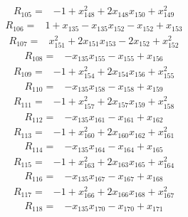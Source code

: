 \begin{align*}
R_{105}={}&-1+x_{148}^{2}+2x_{148}x_{150}+x_{149}^{2}
\end{align*}
\begin{align*}
R_{106}={}&1+x_{135}-x_{135}x_{152}-x_{152}+x_{153}
\end{align*}
\begin{align*}
R_{107}={}&x_{151}^{2}+2x_{151}x_{153}-2x_{152}+x_{152}^{2}
\end{align*}
\begin{align*}
R_{108}={}&-x_{135}x_{155}-x_{155}+x_{156}
\end{align*}
\begin{align*}
R_{109}={}&-1+x_{154}^{2}+2x_{154}x_{156}+x_{155}^{2}
\end{align*}
\begin{align*}
R_{110}={}&-x_{135}x_{158}-x_{158}+x_{159}
\end{align*}
\begin{align*}
R_{111}={}&-1+x_{157}^{2}+2x_{157}x_{159}+x_{158}^{2}
\end{align*}
\begin{align*}
R_{112}={}&-x_{135}x_{161}-x_{161}+x_{162}
\end{align*}
\begin{align*}
R_{113}={}&-1+x_{160}^{2}+2x_{160}x_{162}+x_{161}^{2}
\end{align*}
\begin{align*}
R_{114}={}&-x_{135}x_{164}-x_{164}+x_{165}
\end{align*}
\begin{align*}
R_{115}={}&-1+x_{163}^{2}+2x_{163}x_{165}+x_{164}^{2}
\end{align*}
\begin{align*}
R_{116}={}&-x_{135}x_{167}-x_{167}+x_{168}
\end{align*}
\begin{align*}
R_{117}={}&-1+x_{166}^{2}+2x_{166}x_{168}+x_{167}^{2}
\end{align*}
\begin{align*}
R_{118}={}&-x_{135}x_{170}-x_{170}+x_{171}
\end{align*}
